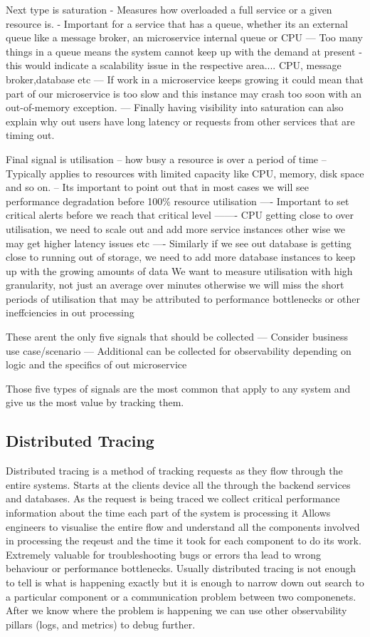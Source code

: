 \documentclass[a4paper, 11pt]{book}
\begin{document}
{    Next type is saturation
    - Measures how overloaded a full service or a given resource is.
    - Important for a service that has a queue, whether its an external queue like a message broker, an microservice internal queue or CPU
    --- Too many things in a queue means the system cannot keep up with the demand at present - this would indicate a scalability issue in the respective area.... CPU, message broker,database etc
    --- If work in a microservice keeps growing it could mean that part of our microservice is too slow and this instance may crash too soon with an out-of-memory exception.
    --- Finally having visibility into saturation can also explain why out users have long latency or requests from other services that are timing out.

    Final signal is utilisation
    -- how busy a resource is over a period of time
    -- Typically applies to resources with limited capacity like CPU, memory, disk space and so on.
    -- Its important to point out that in most cases we will see performance degradation before 100\% resource utilisation
    ---- Important to set critical alerts before we reach that critical level
    ------- CPU getting close to over utilisation, we need to scale out and add more service instances other wise we may get higher latency issues etc
    ---- Similarly if we see out database is getting close to running out of storage, we need to add more database instances to keep up with the growing amounts of data
    We want to measure utilisation with high granularity, not just an average over minutes otherwise we will miss the short periods of utilisation that may be attributed to performance bottlenecks or other ineffciencies in out processing

    These arent the only five signals that should be collected
    --- Consider business use case/scenario
    --- Additional can be collected for observability depending on logic and the specifics of out microservice

    Those five types of signals are the most common that apply to any system and give us the most value by tracking them.

    \subsection{Distributed Tracing}
    Distributed tracing is a method of tracking requests as they flow through the entire systems.
    Starts at the clients device all the through the backend services and databases.
    As the request is being traced we collect critical performance information about the time each part of the system is processing it
    Allows engineers to visualise the entire flow and understand all the components involved in processing the reqeust and the time it took for each component to do its work.
    Extremely valuable for troubleshooting bugs or errors tha lead to wrong behaviour or performance bottlenecks.
    Usually distributed tracing is not enough to tell is what is happening exactly but it is enough to narrow down out search to a particular component or a communication problem between two componenets.
    After we know where the problem is happening we can use other observability pillars (logs, and metrics) to debug further.

}
\end{document}
